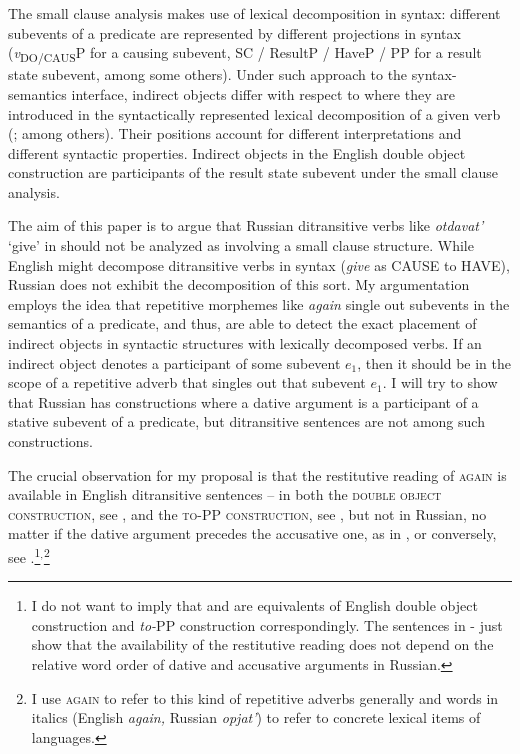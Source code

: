 \documentclass[output=paper]{langscibook}
\begin{document}
{The small clause analysis makes use of lexical decomposition in syntax: different subevents of a predicate are represented by different projections in syntax (}{\textit{v}}{\textsubscript{DO/CAUS}}{P for a causing subevent, SC / ResultP / HaveP / PP for a result state subevent, among some others). Under such approach to the syntax-semantics interface, indirect objects differ with respect to where they are introduced in the syntactically represented lexical decomposition of a given verb (\citealt{Cuervo2003,Schäfer2008}; among others). Their positions account for different interpretations and different syntactic properties. Indirect objects in the English double object construction are participants of the result state subevent under the small clause analysis.}



The aim of this paper is to argue that Russian ditransitive verbs like \textit{otdavat’} ‘give’ in  should not be analyzed as involving a small clause structure. While English might decompose ditransitive verbs in syntax (\textit{give} as CAUSE to HAVE), Russian does not exhibit the decomposition of this sort. My argumentation employs the idea that repetitive morphemes like \textit{again} single out subevents in the semantics of a predicate, and thus, are able to detect the exact placement of indirect objects in syntactic structures with lexically decomposed verbs. If an indirect object denotes a participant of some subevent $e_1$, then it should be in the scope of a repetitive adverb that singles out that subevent $e_1$. I will try to show that Russian has constructions where a dative argument is a participant of a stative subevent of a predicate, but ditransitive sentences are not among such constructions. 


\largerpage[-1]
The crucial observation for my proposal is that the restitutive reading of \textsc{again} is available in English ditransitive sentences -- in both the \textsc{double object construction}, see , and the \textsc{to-PP construction}, see , but not in Russian, no matter if the dative argument precedes the accusative one, as in , or conversely, see .\footnote{I do not want to imply that  and  are equivalents of English double object construction and \textit{to-}PP construction correspondingly. The sentences in - just show that the availability of the restitutive reading does not depend on the relative word order of dative and accusative arguments in Russian.}$^,$\footnote{I use \textsc{again} to refer to this kind of repetitive adverbs generally and words in italics (English \textit{again,} Russian \textit{opjat’}) to refer to concrete lexical items of languages.}
\end{document}
